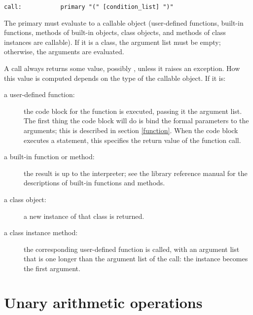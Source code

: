 \begin{verbatim}
call:           primary "(" [condition_list] ")"
\end{verbatim}

The primary must evaluate to a callable object (user-defined
functions, built-in functions, methods of built-in objects, class
objects, and methods of class instances are callable).  If it is a
class, the argument list must be empty; otherwise, the arguments are
evaluated.

A call always returns some value, possibly \verb@None@, unless it
raises an exception.  How this value is computed depends on the type
of the callable object.  If it is:

\begin{description}

\item[a user-defined function:] the code block for the function is
executed, passing it the argument list.  The first thing the code
block will do is bind the formal parameters to the arguments; this is
described in section \ref{function}.  When the code block executes a
\verb@return@ statement, this specifies the return value of the
function call.

\item[a built-in function or method:] the result is up to the
interpreter; see the library reference manual for the descriptions of
built-in functions and methods.

\item[a class object:] a new instance of that class is returned.

\item[a class instance method:] the corresponding user-defined
function is called, with an argument list that is one longer than the
argument list of the call: the instance becomes the first argument.

\end{description}

\section{Unary arithmetic operations}

